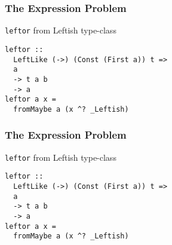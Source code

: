 \begin{frame}[fragile]
\frametitle{The Expression Problem}
\begin{block}{\lstinline{leftor} from Leftish type-class}
\begin{lstlisting}[style=haskell,mathescape]
leftor ::
  LeftLike (->) (Const (First a)) t =>
  a
  -> t a b
  -> a 
leftor a x =
  fromMaybe a (x ^? _Leftish)
\end{lstlisting}
\end{block}
\end{frame}

\begin{frame}[fragile]
\frametitle{The Expression Problem}
\begin{block}{\lstinline{leftor} from Leftish type-class}
\begin{lstlisting}[style=haskell,mathescape]
leftor ::
  LeftLike (->) (Const (First a)) t =>
  a
  -> t a b
  -> a 
leftor a x =
  fromMaybe a (x ^? _Leftish)
\end{lstlisting}
\end{block}
\end{frame}

